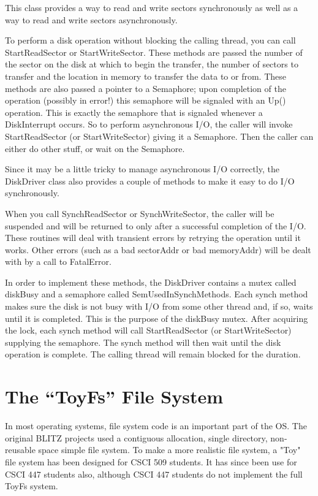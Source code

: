 \documentclass[12pt]{article}
\begin{document}
This class provides a way to read and write sectors synchronously as
well as a way to read and write sectors asynchronously.

To perform a disk operation without blocking the calling thread, you
can call StartReadSector or StartWriteSector.  These methods are
passed the number of the sector on the disk at which to begin the
transfer, the number of sectors to transfer and the location in memory
to transfer the data to or from.  These methods are also passed a
pointer to a Semaphore; upon completion of the operation (possibly in
error!) this semaphore will be signaled with an Up() operation.  This
is exactly the semaphore that is signaled whenever a DiskInterrupt
occurs.  So to perform asynchronous I/O, the caller will invoke
StartReadSector (or StartWriteSector) giving it a Semaphore.  Then the
caller can either do other stuff, or wait on the Semaphore.

Since it may be a little tricky to manage asynchronous I/O correctly,
the DiskDriver class also provides a couple of methods to make it easy
to do I/O synchronously.

When you call SynchReadSector or SynchWriteSector, the caller will be
suspended and will be returned to only after a successful completion
of the I/O.  These routines will deal with transient errors by
retrying the operation until it works.  Other errors (such as a bad
sectorAddr or bad memoryAddr) will be dealt with by a call to
FatalError.

In order to implement these methods, the DiskDriver contains a mutex
called diskBusy and a semaphore called SemUsedInSynchMethods.  Each
synch method makes sure the disk is not busy with I/O from some other
thread and, if so, waits until it is completed.  This is the purpose
of the diskBusy mutex.  After acquiring the lock, each synch method
will call StartReadSector (or StartWriteSector) supplying the
semaphore.  The synch method will then wait until the disk operation
is complete.  The calling thread will remain blocked for the duration.

\section{The ``ToyFs'' File System}

In most operating systems, file system code is an important part of
the OS.  The original BLITZ projects used a contiguous allocation,
single directory, non-reusable space simple file system.  To make a
more realistic file system, a "Toy" file system has been designed for
CSCI 509 students.  It has since been use for CSCI 447 students also,
although CSCI 447 students do not implement the full ToyFs system.
\end{document}
